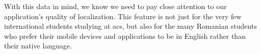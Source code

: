 With this data in mind, we know we need to pay close attention to our application's quality of localization. This feature is not just for the very few international students studying at \acrshort{acs}, but also for the many Romanian students who prefer their mobile devices and applications to be in English rather than their native language.